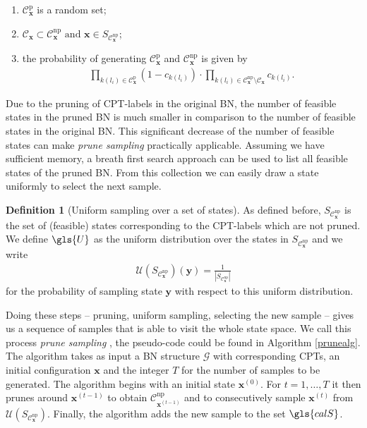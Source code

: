 \documentclass[a4paper, twoside, 11pt]{report}
\newcommand{\bfx}{{\mathbf{x}}}
\newcommand{\C}{{\mathcal C}}
\newcommand{\U}{{\mathcal{U}}}
\theoremstyle{plain}
\theoremstyle{definition}
\newtheorem{definition}[thm]{Definition}
\theoremstyle{remark}
\newcommand{\G}{{\mathcal G}}
\newcommand{\ps}{\textit{prune sampling }}
\newcommand{\bfy}{{\mathbf{y}}}
\begin{document}
\begin{enumerate}
\item $\C_\bfx^{\text{p}}$ is a random set;
\item $\C_\bfx \subset \C_\bfx^{\text{np}} \text{ and } \bfx \in S_{\C_\bfx^{\text{np}}}$;
\item the probability of generating $\C_\bfx^{\text{p}}$ and $\C_\bfx^{\text{np}}$ is given by
\begin{align*}
\prod_{k(l_i) \in \C_\bfx^{\text{p}}}(1-c_{k(l_i)}) \cdot \prod_{k(l_i) \in \C_\bfx^{\text{np}} \setminus \C_{\bfx}} c_{k(l_i)}.
\end{align*}
\end{enumerate}
Due to the pruning of CPT-labels in the original BN, the number of feasible states in the pruned BN is much smaller in comparison to the number of feasible states in the original BN. This significant decrease of the number of feasible states can make \ps practically applicable. Assuming we have sufficient memory, a breath first search approach can be used to list all feasible states of the pruned BN. From this collection we can easily draw a state uniformly to select the next sample.

\begin{definition}[Uniform sampling over a set of states]
As defined before, $S_{\C_\bfx^{\text{np}}}$ is the set of (feasible) states corresponding to the CPT-labels which are not pruned. We define $\gls{U}$
as the uniform distribution over the states in $S_{\C_\bfx^{\text{np}}}$ and we write
\begin{align*}
\U(S_{\C_\bfx^{\text{np}}})(\bfy) = \frac{1}{|S_{\C_\bfx^{\text{np}}}|}
\end{align*}
for the probability of sampling state $\bfy$ with respect to this uniform distribution.
\end{definition}
Doing these steps -- pruning, uniform sampling, selecting the new sample --  gives us a sequence of samples that is able to visit the whole state space. We call this process \ps, the pseudo-code could be found in Algorithm \ref{prunealg}. The algorithm takes as input a BN structure $\G$ with corresponding CPTs, an initial configuration $\bfx$ and the integer $T$ for the number of samples to be generated. The algorithm begins with an initial state $\bfx^{(0)}$. For $t = 1, \ldots , T$ it then prunes around $\bfx^{(t-1)}$ to obtain $\C_{\bfx^{(t-1)}}^{\text{np}}$ and to consecutively sample $\bfx^{(t)}$ from $\U(S_{\C_\bfx^{\text{np}}})$. Finally, the algorithm adds the new sample to the set $\gls{calS}$.  \\
\end{document}
